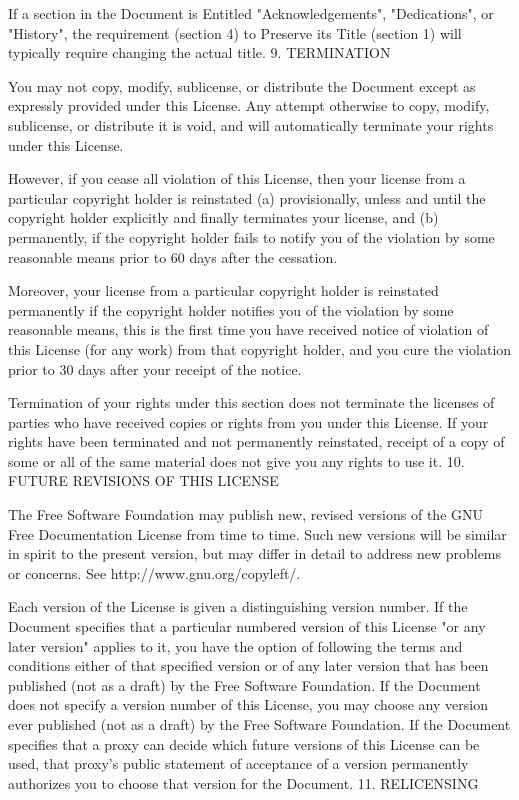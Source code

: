 {\begin{multicols}{4}
If a section in the Document is Entitled "Acknowledgements", "Dedications", or "History", the requirement (section 4) to Preserve its Title (section 1) will typically require changing the actual title.
9. TERMINATION

You may not copy, modify, sublicense, or distribute the Document except as expressly provided under this License. Any attempt otherwise to copy, modify, sublicense, or distribute it is void, and will automatically terminate your rights under this License.

However, if you cease all violation of this License, then your license from a particular copyright holder is reinstated (a) provisionally, unless and until the copyright holder explicitly and finally terminates your license, and (b) permanently, if the copyright holder fails to notify you of the violation by some reasonable means prior to 60 days after the cessation.

Moreover, your license from a particular copyright holder is reinstated permanently if the copyright holder notifies you of the violation by some reasonable means, this is the first time you have received notice of violation of this License (for any work) from that copyright holder, and you cure the violation prior to 30 days after your receipt of the notice.

Termination of your rights under this section does not terminate the licenses of parties who have received copies or rights from you under this License. If your rights have been terminated and not permanently reinstated, receipt of a copy of some or all of the same material does not give you any rights to use it.
10. FUTURE REVISIONS OF THIS LICENSE

The Free Software Foundation may publish new, revised versions of the GNU Free Documentation License from time to time. Such new versions will be similar in spirit to the present version, but may differ in detail to address new problems or concerns. See http://www.gnu.org/copyleft/.

Each version of the License is given a distinguishing version number. If the Document specifies that a particular numbered version of this License "or any later version" applies to it, you have the option of following the terms and conditions either of that specified version or of any later version that has been published (not as a draft) by the Free Software Foundation. If the Document does not specify a version number of this License, you may choose any version ever published (not as a draft) by the Free Software Foundation. If the Document specifies that a proxy can decide which future versions of this License can be used, that proxy's public statement of acceptance of a version permanently authorizes you to choose that version for the Document.
11. RELICENSING


\end{multicols}}

